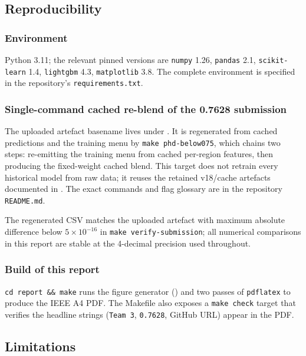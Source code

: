 \documentclass[conference,10pt,a4paper]{IEEEtran}
\begin{document}
\subsection{Reproducibility}

\subsubsection{Environment}
Python 3.11; the relevant pinned versions are \texttt{numpy} 1.26, \texttt{pandas} 2.1, \texttt{scikit-learn} 1.4, \texttt{lightgbm} 4.3, \texttt{matplotlib} 3.8. The complete environment is specified in the repository's \texttt{requirements.txt}.

\subsubsection{Single-command cached re-blend of the 0.7628 submission}
The uploaded artefact basename  lives under . It is regenerated from cached predictions and the training menu by \texttt{make phd-below075}, which chains two steps: re-emitting the training menu from cached per-region features, then producing the fixed-weight cached blend. This target does not retrain every historical model from raw data; it reuses the retained v18/cache artefacts documented in . The exact commands and flag glossary are in the repository \texttt{README.md}.

\noindent The regenerated CSV matches the uploaded artefact with maximum absolute difference below $5\times10^{-16}$ in \texttt{make verify-submission}; all numerical comparisons in this report are stable at the 4-decimal precision used throughout.

\subsubsection{Build of this report}
\texttt{cd report \&\& make} runs the figure generator () and two passes of \texttt{pdflatex} to produce the IEEE A4 PDF. The Makefile also exposes a \texttt{make check} target that verifies the headline strings (\texttt{Team 3}, \texttt{0.7628}, GitHub URL) appear in the PDF.

\subsection{Limitations}
\end{document}
